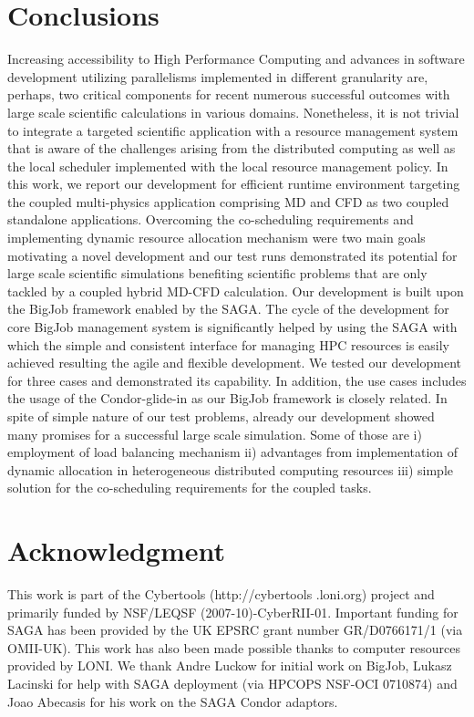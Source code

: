 \documentclass[conference,final]{IEEEtran}
\begin{document}
\section{Conclusions}
Increasing accessibility to High Performance Computing and advances in
software development utilizing parallelisms implemented in different
granularity are, perhaps, two critical components for recent numerous
successful outcomes with large scale scientific calculations in
various domains. Nonetheless, it is not trivial to integrate a
targeted scientific application with a resource management system that
is aware of the challenges arising from the distributed computing as
well as the local scheduler implemented with the local resource
management policy. In this work, we report our development for
efficient runtime environment targeting the coupled multi-physics
application comprising MD and CFD as two coupled standalone
applications. Overcoming the co-scheduling requirements and
implementing dynamic resource allocation mechanism were two main goals
motivating a novel development and our test runs demonstrated its
potential for large scale scientific simulations benefiting scientific
problems that are only tackled by a coupled hybrid MD-CFD calculation.
Our development is built upon the BigJob framework enabled by the
SAGA. The cycle of the development for core BigJob management system
is significantly helped by using the SAGA with which the simple and
consistent interface for managing HPC resources is easily achieved
resulting the agile and flexible development. We tested our
development for three cases and demonstrated its capability. In
addition, the use cases includes the usage of the Condor-glide-in as
our BigJob framework is closely related. In spite of simple nature of
our test problems, already our development showed many promises for a
successful large scale simulation. Some of those are i) employment of
load balancing mechanism ii) advantages from implementation of dynamic
allocation in heterogeneous distributed computing resources iii)
simple solution for the co-scheduling requirements for the coupled
tasks.

\section*{Acknowledgment}
This work is part of the Cybertools (http://cybertools .loni.org)
project and primarily funded by NSF/LEQSF (2007-10)-CyberRII-01.
Important funding for SAGA has been provided by the UK EPSRC grant
number GR/D0766171/1 (via OMII-UK). This work has also been made
possible thanks to computer resources provided by LONI. We thank Andre
Luckow for initial work on BigJob, Lukasz Lacinski for help with SAGA
deployment (via HPCOPS NSF-OCI 0710874) and Joao Abecasis for his work
on the SAGA Condor adaptors.

\nocite{ex1,ex2}
%


\end{document}
